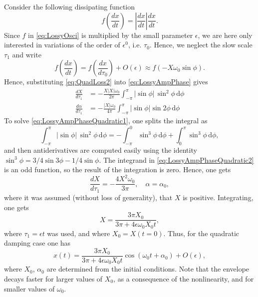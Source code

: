 \documentclass[11pt,twoside,a4paper,english]{book}
\begin{document}
Consider the following dissipating function
\begin{equation}\label{eq:QuadLoss1}
f\left( \frac{dx}{dt}\right) = \left| \frac{dx}{dt}\right| \frac{dx}{dt}.
\end{equation}
Since $f$ in \eqref{eq:LossyOsci} is multiplied by the small parameter $\epsilon$, we are here only interested in variations of the order of $\epsilon^0$, i.e. $\tau_0$. Hence, we neglect the slow scale $\tau_1$ and write
\begin{equation}\label{eq:QuadLoss2}
f\left(\frac{dx}{dt}\right) = f\left(\frac{dx}{d\tau_0}\right) + O(\epsilon) \approx f\left(-X\omega_0\sin\phi\right).
\end{equation}
Hence, substituting \eqref{eq:QuadLoss2} into \eqref{eq:LossyAmpPhase} gives
\begin{subequations}\label{eq:LossyAmpPhaseQuadratic}
\begin{align}
\frac{dX}{d\tau_1} &= -\frac{X|X|\omega_0}{2\pi}\int_{-\pi}^{\pi} |\sin\phi|\, \sin^2\phi \, \mathrm{d}\phi \label{eq:LossyAmpPhaseQuadratic1}\\
\frac{d\alpha}{d\tau_1} &= -\frac{|X|\omega_0}{4\pi}\int_{-\pi}^{\pi} |\sin\phi| \sin 2\phi  \, \mathrm{d}\phi  \label{eq:LossyAmpPhaseQuadratic2}
\end{align}
\end{subequations}
To solve \eqref{eq:LossyAmpPhaseQuadratic1}, one splits the integral as
\begin{equation}
\int_{-\pi}^{\pi} |\sin\phi|\, \sin^2\phi \, \mathrm{d}\phi  = -\int_{-\pi}^{0} \sin^3\phi \, \mathrm{d}\phi + \int_{0}^{\pi} \sin^3\phi \, \mathrm{d}\phi,
\end{equation}
and then antiderivatives are computed easily using the identity $\sin^3\phi = 3/4 \sin3\phi - 1/4\sin\phi$. The integrand in \eqref{eq:LossyAmpPhaseQuadratic2} is  an odd function, so the result of the integration is zero. Hence, one gets
\begin{equation}
\frac{dX}{d\tau_1} = -\frac{4X^2\omega_0}{3\pi}, \quad \alpha = \alpha_0,
\end{equation}
where it was assumed (without loss of generality), that $X$ is positive. Integrating, one gets
\begin{equation}
X = \frac{3\pi X_0}{3\pi + 4\epsilon\omega_0X_0t},
\end{equation}
where $\tau_1=\epsilon t$ was used, and where $X_0=X(t=0).$ Thus, for the quadratic damping case one has
\begin{equation}\label{eq:xtQuadraticLoss}
x(t) = \frac{3\pi X_0}{3\pi + 4\epsilon\omega_0X_0t} \cos(\omega_0 t + \alpha_0) + O(\epsilon),
\end{equation}
where $X_0$, $\alpha_0$ are determined from the initial conditions. Note that the envelope decays faster for larger values of $X_0$, as a consequence of the nonlinearity, and for smaller values of $\omega_0$.
\end{document}
